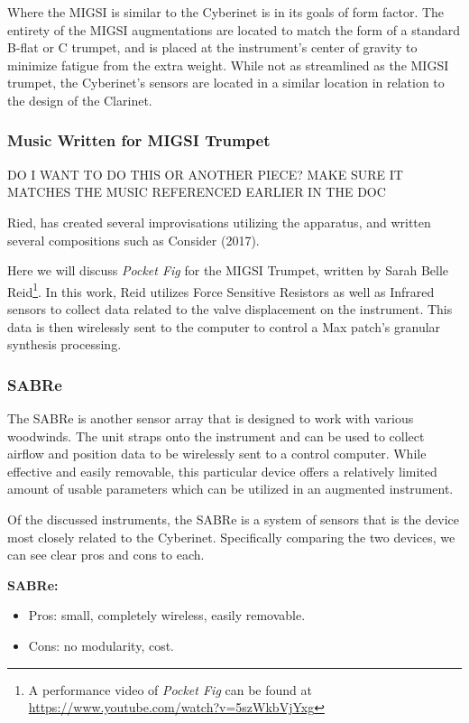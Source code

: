 Where the MIGSI is similar to the Cyberinet is in its goals of form factor. The entirety of the MIGSI augmentations are located to match the form of a standard B-flat or C trumpet, and is placed at the instrument's center of gravity to minimize fatigue from the extra weight. While not as streamlined as the MIGSI trumpet, the Cyberinet's sensors are located in a similar location in relation to the design of the Clarinet.


\subsubsection{Music Written for MIGSI Trumpet}

DO I WANT TO DO THIS OR ANOTHER PIECE? MAKE SURE IT MATCHES THE MUSIC REFERENCED EARLIER IN THE DOC

Ried, has created several improvisations utilizing the apparatus, and written several compositions such as Consider (2017).

Here we will discuss \textit{Pocket Fig} for the MIGSI Trumpet, written by Sarah Belle Reid\footnote{A performance video of \textit{Pocket Fig} can be found at \url{https://www.youtube.com/watch?v=5szWkbVjYxg}}. In this work, Reid utilizes Force Sensitive Resistors as well as Infrared sensors to collect data related to the valve displacement on the instrument. This data is then wirelessly sent to the computer to control a Max patch's granular synthesis processing.

\subsubsection{SABRe}

The SABRe is another sensor array that is designed to work with various woodwinds. The unit straps onto the instrument and can be used to collect airflow and position data to be wirelessly sent to a control computer. While effective and easily removable, this particular device offers a relatively limited amount of usable parameters which can be utilized in an augmented instrument.

Of the discussed instruments, the SABRe is a system of sensors that is the device most closely related to the Cyberinet. Specifically comparing the two devices, we can see clear pros and cons to each.

\textbf{SABRe:}

\begin{itemize}
    \item Pros: small, completely wireless, easily removable.
    \item Cons: no modularity, cost.
\end{itemize}

